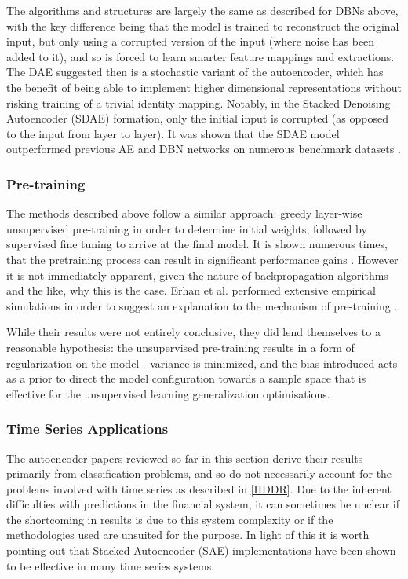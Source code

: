 \documentclass[a4paper,11pt,oneside]{article}
\theoremstyle{plain}
\theoremstyle{definition}
\begin{document}
The algorithms and structures are largely the same as described for DBNs above, with the key difference 
being that the model is trained to reconstruct the original input, but only using a corrupted version of the input 
(where noise has been added to it), and so is forced to learn smarter feature mappings and extractions. 
The DAE suggested then is a stochastic variant of the autoencoder, which has the benefit of being able to 
implement higher dimensional representations without risking training of a trivial identity mapping. Notably, 
in the Stacked Denoising Autoencoder (SDAE) formation, only the initial input is corrupted (as opposed to the 
input from layer to layer). It was shown that the SDAE model outperformed previous AE and DBN networks on 
numerous benchmark datasets \cite{Vincent} . 

\subsubsection{Pre-training}

The methods described above follow a similar approach: greedy layer-wise unsupervised pre-training in order to 
determine initial weights, followed by supervised fine tuning to arrive at the final model. It is shown numerous times, 
that the pretraining process can result in significant performance gains \cite{Vincent}. However it is not immediately apparent, 
given the nature of backpropagation algorithms and the like, why this is the case. Erhan et al. performed 
extensive empirical simulations in order to suggest an explanation to the mechanism of pre-training \cite{Erhan}.
 \hfill \break 

While their results were not entirely conclusive, they did lend themselves to a reasonable hypothesis: 
the unsupervised pre-training results in a form of regularization on the model - variance is minimized, and the 
bias introduced acts as a prior to direct the model configuration towards a sample space that is effective for the unsupervised 
learning generalization optimisations.

\subsubsection{Time Series Applications}

The autoencoder papers reviewed so far in this section derive their results primarily from classification problems, 
and so do not necessarily account for the problems involved with time series as described in \ref{HDDR}. Due to 
the inherent difficulties with predictions in the financial system, it can sometimes be unclear if the shortcoming in 
results is due to this system complexity or if the methodologies used are unsuited for the purpose. In light of this 
it is worth pointing out that Stacked Autoencoder (SAE) implementations have been shown to be effective in many
 time series systems.  
 \hfill \break 
\end{document}
